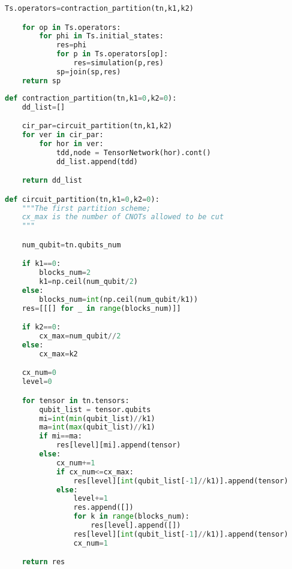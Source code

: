 {\begin{lstlisting}[language=Python, caption=对量子线路应用contraction优化方案计算一步迁移]
    Ts.operators=contraction_partition(tn,k1,k2)

    for op in Ts.operators:
        for phi in Ts.initial_states:
            res=phi
            for p in Ts.operators[op]:
                res=simulation(p,res)
            sp=join(sp,res)
    return sp
\end{lstlisting}

\begin{lstlisting}[language=Python, caption={contraction方案中的电路划分函数}]
def contraction_partition(tn,k1=0,k2=0):
    dd_list=[]

    cir_par=circuit_partition(tn,k1,k2)
    for ver in cir_par:
        for hor in ver:
            tdd,node = TensorNetwork(hor).cont()
            dd_list.append(tdd)

    return dd_list

def circuit_partition(tn,k1=0,k2=0):
    """The first partition scheme;
    cx_max is the number of CNOTs allowed to be cut
    """

    num_qubit=tn.qubits_num

    if k1==0:
        blocks_num=2
        k1=np.ceil(num_qubit/2)
    else:
        blocks_num=int(np.ceil(num_qubit/k1))
    res=[[[] for _ in range(blocks_num)]]

    if k2==0:
        cx_max=num_qubit//2
    else:
        cx_max=k2

    cx_num=0
    level=0

    for tensor in tn.tensors:
        qubit_list = tensor.qubits
        mi=int(min(qubit_list)//k1)
        ma=int(max(qubit_list)//k1)
        if mi==ma:
            res[level][mi].append(tensor)
        else:
            cx_num+=1
            if cx_num<=cx_max:
                res[level][int(qubit_list[-1]//k1)].append(tensor)
            else:
                level+=1
                res.append([])
                for k in range(blocks_num):
                    res[level].append([])
                res[level][int(qubit_list[-1]//k1)].append(tensor)
                cx_num=1

    return res
\end{lstlisting}

\thispagestyle{appendixheader}
}